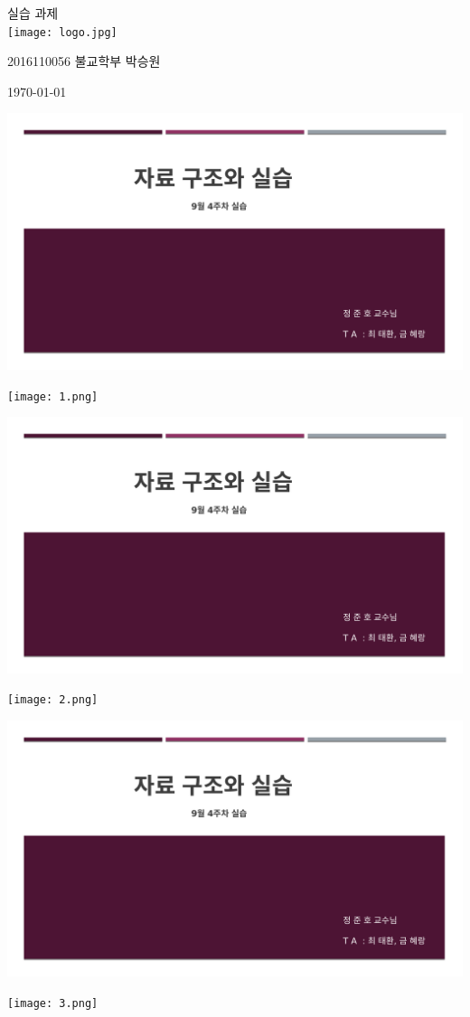 \documentclass[11pt,a4paper]{article}
\begin{document}
\begin{center}
	  실습  과제\\
	\vspace{2cm}
\hfill\texttt{[image: logo.jpg]}

\hfill\Large 2016110056 불교학부 박승원

\hfill\today
\end{center}

\noindent
\lstset{language=C, columns=flexible, tabsize=4, frame=shadowbox, showstringspaces=false, breaklines=true, upquote=true, basicstyle=\ttfamily\large}
\begin{enumerate}
\includegraphics[page=2, width=\textwidth]{1.pdf}
	
\texttt{[image: 1.png]}	

\includegraphics[page=3, width=\textwidth]{1.pdf}
	
\texttt{[image: 2.png]}	


\includegraphics[page=4, width=\textwidth]{1.pdf}
	
\texttt{[image: 3.png]}	


\end{enumerate}
\end{document}
